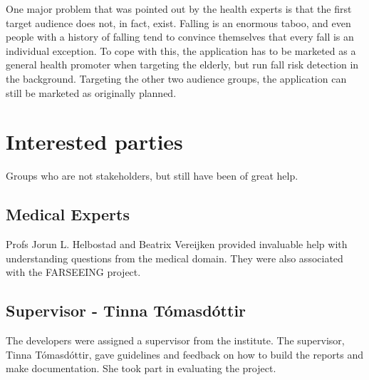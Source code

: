 One major problem that was pointed out by the health experts is that the first target audience does not, in fact, exist. Falling is an enormous taboo, and even people with a history of falling tend to convince themselves that every fall is an individual exception. To cope with this, the application has to be marketed as a general health promoter when targeting the elderly, but run fall risk detection in the background. Targeting the other two audience  groups, the application can still be marketed as originally planned. 

\section{Interested parties}
Groups who are not stakeholders, but still have been of great help.
\subsection{Medical Experts}
Profs Jorun L. Helbostad and Beatrix Vereijken provided invaluable help with understanding questions from the medical domain. They were also associated with the FARSEEING project.
 \subsection{Supervisor - Tinna T\'{o}masd\'{o}ttir}
The developers were assigned a supervisor from the institute. The supervisor, Tinna T\'{o}masd\'{o}ttir, gave guidelines and feedback on how to build the reports and make documentation. She took part in evaluating the project.
